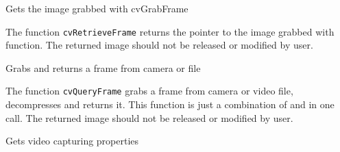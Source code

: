 
Gets the image grabbed with cvGrabFrame


\begin{description}
\end{description}

The function \texttt{cvRetrieveFrame} returns the pointer to the image grabbed with  function. The returned image should not be released or modified by user.


Grabs and returns a frame from camera or file


\begin{description}
\end{description}

The function \texttt{cvQueryFrame} grabs a frame from camera or video file, decompresses and returns it. This function is just a combination of  and  in one call. The returned image should not be released or modified by user.


Gets video capturing properties


